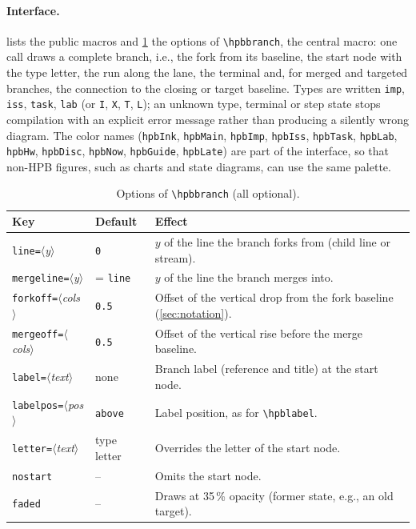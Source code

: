 \paragraph{Interface.}
 lists the public macros and \cref{tab:api-keys} the options
of \texttt{\textbackslash hpbbranch}, the central macro: one call draws a
complete branch, i.e., the fork from its baseline, the start node with the
type letter, the run along the lane, the terminal and, for merged and
targeted branches, the connection to the closing or target baseline. Types
are written \texttt{imp}, \texttt{iss}, \texttt{task}, \texttt{lab} (or
\texttt{I}, \texttt{X}, \texttt{T}, \texttt{L}); an unknown type, terminal
or step state stops compilation with an explicit error message rather than
producing a silently wrong diagram. The color names (\texttt{hpbInk},
\texttt{hpbMain}, \texttt{hpbImp}, \texttt{hpbIss}, \texttt{hpbTask},
\texttt{hpbLab}, \texttt{hpbHw}, \texttt{hpbDisc}, \texttt{hpbNow},
\texttt{hpbGuide}, \texttt{hpbLate}) are part of the interface, so that
non-HPB figures, such as charts and state diagrams, can use the same palette.

\providecommand{\HPBmac}[1]{\texttt{\textbackslash #1}}
\providecommand{\HPBarg}[1]{\ensuremath{\langle}\textit{#1}\ensuremath{\rangle}}

\begin{table}[tbp]
  \centering
  \small
  \caption{Options of \texttt{\textbackslash hpbbranch} (all optional).}
  \label{tab:api-keys}
  \renewcommand{\arraystretch}{1.0}
  \begin{tabularx}{\linewidth}{@{}>{\raggedright\arraybackslash}p{3.0cm}
      >{\raggedright\arraybackslash}p{2.0cm}
      >{\raggedright\arraybackslash}X@{}}
    \toprule
    Key & Default & Effect \\
    \midrule
    \texttt{line=}\HPBarg{y} & \texttt{0}
      & $y$ of the line the branch forks from (child line or stream). \\
    \texttt{mergeline=}\HPBarg{y} & = \texttt{line}
      & $y$ of the line the branch merges into. \\
    \texttt{forkoff=}\HPBarg{cols} & \texttt{0.5}
      & Offset of the vertical drop from the fork baseline (\cref{sec:notation}). \\
    \texttt{mergeoff=}\HPBarg{cols} & \texttt{0.5}
      & Offset of the vertical rise before the merge baseline. \\
    \texttt{label=}\HPBarg{text} & none
      & Branch label (reference and title) at the start node. \\
    \texttt{labelpos=}\HPBarg{pos} & \texttt{above}
      & Label position, as for \HPBmac{hpblabel}. \\
    \texttt{letter=}\HPBarg{text} & type letter
      & Overrides the letter of the start node. \\
    \texttt{nostart} & --
      & Omits the start node. \\
    \texttt{faded} & --
      & Draws at 35\,\% opacity (former state, e.g., an old target). \\
    \bottomrule
  \end{tabularx}
\end{table}

